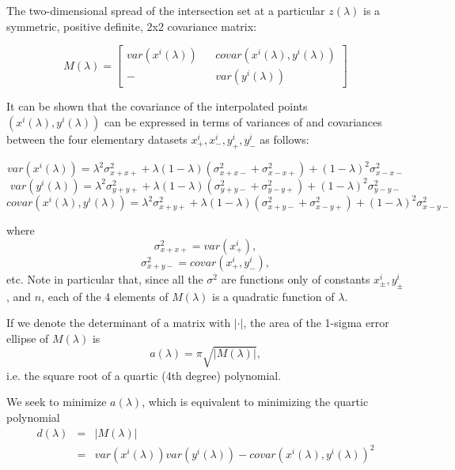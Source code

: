 \documentclass[10pt]{amsart}
\begin{document}
The two-dimensional spread of the intersection set at a particular $z(\lambda)$
is a symmetric, positive definite, 2x2 covariance matrix:

\[M(\lambda) =
\begin{bmatrix}
 var(x^i(\lambda)) && covar(x^i(\lambda),y^i(\lambda)) \\
  -                && var(y^i(\lambda))
\end{bmatrix}
\]

It can be shown that the covariance of the interpolated points
$(x^i(\lambda), y^i(\lambda))$ can be expressed in terms of variances of and
covariances between the four elementary datasets $x^i_+, x^i_-, y^i_+, y^i_-$ as
follows:

\begin{equation}\label{varx}
var(x^i(\lambda)) = \lambda^2\sigma^2_{x+x+} + \lambda(1-\lambda)(\sigma^2_{x+x-} + \sigma^2_{x-x+}) 
                + (1-\lambda)^2\sigma^2_{x-x-}
\end{equation}
\begin{equation}\label{vary}
var(y^i(\lambda)) = \lambda^2\sigma^2_{y+y+} + \lambda(1-\lambda)(\sigma^2_{y+y-} + \sigma^2_{y-y+}) 
                + (1-\lambda)^2\sigma^2_{y-y-}\end{equation}
\begin{equation}\label{covarxy}
covar(x^i(\lambda),y^i(\lambda)) = \lambda^2\sigma^2_{x+y+}  
                        + \lambda(1-\lambda)(\sigma^2_{x+y-} + \sigma^2_{x-y+}) 
                              + (1-\lambda)^2\sigma^2_{x-y-}
\end{equation}

where
$$\sigma^2_{x+x+}=var(x^i_+),$$
$$\sigma^2_{x+y-}=covar(x^i_+, y^i_-),$$ 
etc. Note in particular that, since all the $\sigma^2$ are functions only of
constants $x^i_\pm, y^i_\pm$, and $n$, each of the 4 elements of $M(\lambda)$ is
a quadratic function of $\lambda$.

If we denote the determinant of a matrix with $|\cdot|$, the area of the
1-sigma error ellipse of $M(\lambda)$ is
$$a(\lambda) = \pi\sqrt{|M(\lambda)|},$$
i.e. the square root of a quartic (4th degree) polynomial.

We seek to minimize $a(\lambda)$, which is equivalent to minimizing
the quartic polynomial 
\begin{eqnarray*}
d(\lambda)&=&|M(\lambda)| \\
          &=&var(x^i(\lambda))var(y^i(\lambda)) - covar(x^i(\lambda),y^i(\lambda))^2
\end{eqnarray*}
\end{document}
